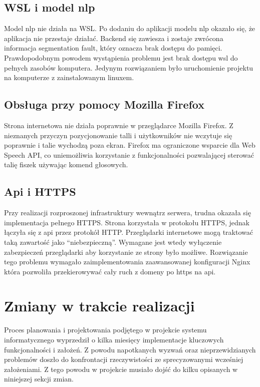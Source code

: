 \subsection{WSL i model nlp}
Model nlp nie działa na WSL. Po dodaniu do aplikacji modelu nlp okazało się, że aplikacja nie przestaje działać. Backend się zawiesza i zostaje zwrócona informacja segmentation fault, który oznacza brak dostępu do pamięci. Prawdopodobnym powodem wystąpienia problemu jest brak dostępu wsl do pełnych zasobów komputera. Jedynym rozwiązaniem było uruchomienie projektu na komputerze z zainstalowanym linuxem.

\subsection{Obsługa przy pomocy Mozilla Firefox}
Strona internetowa nie działa poprawnie w przeglądarce Mozilla Firefox. Z nieznanych przyczyn pozycjonowanie talli i użytkowników nie wczytuje się poprawnie i talie wychodzą poza ekran. Firefox ma ograniczone wsparcie dla Web Speech API,  co uniemożliwia korzystanie z funkcjonalności pozwalającej sterować talię fiszek używając komend głosowych.

\subsection{Api i HTTPS}
Przy realizacji rozproszonej infrastruktury wewnątrz serwera, trudna okazała się implementacja pełnego HTTPS. Strona korzystała w protokołu HTTPS, jednak łączyła się z api przez protokół HTTP. Przeglądarki internetowe mogą traktować taką zawartość jako “niebezpieczną”. Wymagane jest wtedy wyłączenie zabezpieczeń przeglądarki aby korzystanie ze strony było możliwe. Rozwiązanie tego problemu wymagało zaimplementowania zaawansowanej konfiguracji Nginx która pozwoliła przekierowywać cały ruch z domeny po https na api.

\section{Zmiany w trakcie realizacji}
Proces planowania i projektowania podjętego w projekcie systemu informatycznego wyprzedził o kilka miesięcy implementacje kluczowych funkcjonalności i założeń. Z powodu napotkanych wyzwań oraz nieprzewidzianych problemów doszło do konfrontacji rzeczywistości ze sprecyzowanymi wcześniej założeniami. Z tego powodu w projekcie musiało dojść do kilku opisanych w niniejszej sekcji zmian.

